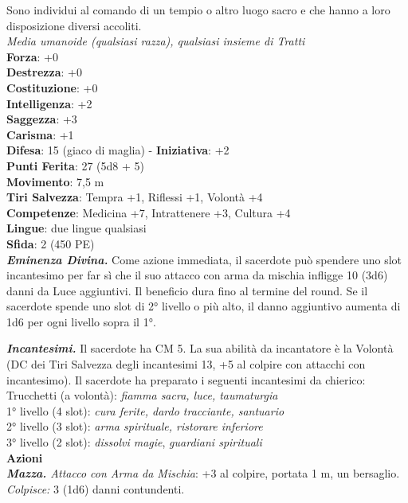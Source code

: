\begin{multicols}{2}
Sono individui al comando di un tempio o altro luogo sacro e che hanno a loro disposizione diversi accoliti.\\
\emph{Media umanoide (qualsiasi razza), qualsiasi insieme di Tratti}\\
\textbf{Forza}: +0\\
\textbf{Destrezza}: +0\\
\textbf{Costituzione}: +0\\
\textbf{Intelligenza}: +2\\
\textbf{Saggezza}: +3\\
\textbf{Carisma}: +1\\
\textbf{Difesa}: 15 (giaco di maglia) - \textbf{Iniziativa}: +2\\
\textbf{Punti Ferita}: 27 (5d8 + 5)\\
\textbf{Movimento}: 7,5 m\\
\textbf{Tiri Salvezza}: Tempra +1, Riflessi +1, Volontà +4 \\
\textbf{Competenze}: Medicina +7, Intrattenere +3, Cultura +4\\
\textbf{Lingue}: due lingue qualsiasi\\
\textbf{Sfida}: 2 (450 PE)\smallskip\\
\emph{\textbf{Eminenza Divina.}} Come azione immediata, il sacerdote può spendere uno slot incantesimo per far sì che il suo attacco con arma da mischia infligge 10 (3d6) danni da Luce aggiuntivi. Il beneficio dura fino al termine del round. Se il sacerdote spende uno slot di 2° livello o più alto, il danno aggiuntivo aumenta di 1d6 per ogni livello sopra il 1°.

\emph{\textbf{Incantesimi.}} Il sacerdote ha CM 5. La sua abilità da incantatore è la Volontà (DC dei Tiri Salvezza degli incantesimi 13, +5 al colpire con attacchi con incantesimo). Il sacerdote ha preparato i seguenti incantesimi da chierico: \\
Trucchetti (a volontà): \emph{fiamma sacra, luce, taumaturgia}\\
1° livello (4 slot): \emph{cura ferite, dardo tracciante, santuario}\\
2° livello (3 slot): \emph{arma spirituale, ristorare inferiore}\\
3° livello (2 slot): \emph{dissolvi magie}, \emph{guardiani spirituali}\\
\smallskip\textbf{Azioni}\\
\emph{\textbf{Mazza.} Attacco con Arma da Mischia}: +3 al colpire, portata 1 m, un bersaglio.\\
\emph{Colpisce:} 3 (1d6) danni contundenti.\\


\end{multicols}
